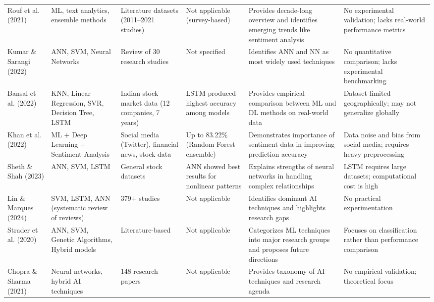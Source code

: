 \documentclass[11pt,a4paper]{article}
\begin{document}
{\begin{longtable}{L{2.0cm} L{2.2cm} L{2.4cm} L{2.6cm} L{2.8cm} L{2.5cm}}
Rouf et al. (2021) \cite{rouf2021} & ML, text analytics, ensemble methods & Literature datasets
(2011--2021 studies) & Not applicable (survey-based) & Provides decade-long overview and identifies
emerging trends like sentiment analysis & No experimental validation; lacks real-world performance
metrics \\

Kumar \& Sarangi (2022) \cite{kumar2022} & ANN, SVM, Neural Networks & Review of 30 research
studies & Not specified & Identifies ANN and NN as most widely used techniques & No quantitative
comparison; lacks experimental benchmarking \\

Bansal et al. (2022) \cite{bansal2022} & KNN, Linear Regression, SVR, Decision Tree, LSTM & Indian
stock market data (12 companies, 7 years) & LSTM produced highest accuracy among models &
Provides empirical comparison between ML and DL methods on real-world data & Dataset limited
geographically; may not generalize globally \\

Khan et al. (2022) \cite{khan2022} & ML + Deep Learning + Sentiment Analysis & Social media
(Twitter), financial news, stock data & Up to 83.22\% (Random Forest ensemble) & Demonstrates
importance of sentiment data in improving prediction accuracy & Data noise and bias from social
media; requires heavy preprocessing \\

Sheth \& Shah (2023) \cite{sheth2023} & ANN, SVM, LSTM & General stock datasets & ANN showed
best results for nonlinear patterns & Explains strengths of neural networks in handling complex
relationships & LSTM requires large datasets; computational cost is high \\

Lin \& Marques (2024) \cite{lin2024} & SVM, LSTM, ANN (systematic review of reviews) & 379+
studies & Not applicable & Identifies dominant AI techniques and highlights research gaps & No
practical experimentation \\

Strader et al. (2020) \cite{strader2020} & ANN, SVM, Genetic Algorithms, Hybrid models &
Literature-based & Not applicable & Categorizes ML techniques into major research groups and
proposes future directions & Focuses on classification rather than performance comparison \\

Chopra \& Sharma (2021) \cite{chopra2021} & Neural networks, hybrid AI techniques & 148 research
papers & Not applicable & Provides taxonomy of AI techniques and research agenda & No empirical
validation; theoretical focus \\


\end{longtable}}
\end{document}

